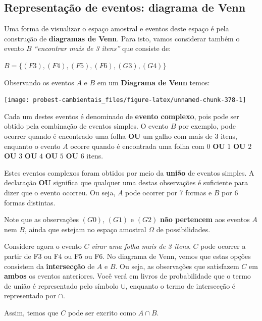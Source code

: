 \documentclass[
]{book}
\begin{document}
\hypertarget{representauxe7uxe3o-de-eventos-diagrama-de-venn}{%
\subsection{Representação de eventos: diagrama de Venn}\label{representauxe7uxe3o-de-eventos-diagrama-de-venn}}

Uma forma de visualizar o espaço amostral e eventos deste espaço é pela construção de \textbf{diagramas de Venn}. Para isto, vamos considerar também o evento \(B\) \emph{``encontrar mais de 3 itens''} que consiste de:

\(B = \{(F3), (F4), (F5), (F6), (G3), (G4)\}\)

Observando os eventos \(A\) e \(B\) em um \textbf{Diagrama de Venn} temos:

\begin{center}\texttt{[image: probest-cambientais\_files/figure-latex/unnamed-chunk-378-1]} \end{center}

Cada um destes eventos é denominado de \textbf{evento complexo}, pois pode ser obtido pela combinação de eventos simples. O evento \(B\) por exemplo, pode ocorrer quando é encontrado uma folha \textbf{OU} um galho com mais de 3 itens, enquanto o evento \(A\) ocorre quando é encontrada uma folha com \(0\) \textbf{OU} \(1\) \textbf{OU} \(2\) \textbf{OU} \(3\) \textbf{OU} \(4\) \textbf{OU} \(5\) \textbf{OU} \(6\) itens.

Estes eventos complexos foram obtidos por meio da \textbf{união} de eventos simples. A declaração \textbf{OU} significa que qualquer uma destas observações é suficiente para dizer que o evento ocorreu. Ou seja, \(A\) pode ocorrer por 7 formas e \(B\) por 6 formas distintas.

Note que as observações \((G0)\), \((G1)\) e \((G2)\) \textbf{não pertencem} aos eventos \(A\) nem \(B\), ainda que estejam no espaço amostral \(\Omega\) de possibilidades.

Considere agora o evento \(C\) \emph{virar uma folha mais de 3 itens}. \(C\) pode ocorrer a partir de F3 ou F4 ou F5 ou F6. No diagrama de Venn, vemos que estas opções consistem da \textbf{intersecção} de \(A\) e \(B\). Ou seja, as observações que satisfazem \(C\) em \textbf{ambos} os eventos anteriores. Você verá em livros de probabilidade que o termo de união é representado pelo símbolo \(\cup\), enquanto o termo de intersecção é representado por \(\cap\).

Assim, temos que \(C\) pode ser excrito como \(A \cap B\).
\end{document}
